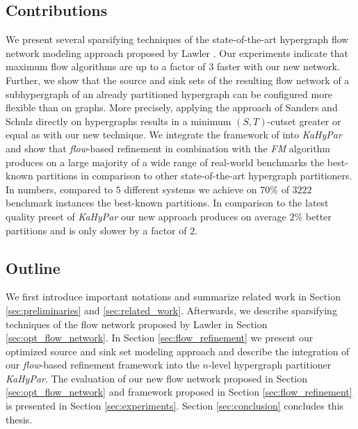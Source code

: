 \subsection{Contributions}

We present several sparsifying techniques of the state-of-the-art hypergraph flow network
modeling approach proposed by Lawler \cite{lawler1973}. Our experiments indicate that
maximum flow algorithms are up to a factor of $3$ faster with our new network. Further, 
we show that the source and sink sets of the resulting flow network of a subhypergraph 
of an already partitioned hypergraph can be configured more flexible than on graphs. More 
precisely, applying the approach of Sanders and Schulz \cite{sanders2011engineering}
directly on hypergraphs results in a minimum $(S,T)$-cutset greater or equal as with
our new technique. We integrate the framework of \cite{sanders2011engineering} into 
\emph{KaHyPar} and show that \emph{flow}-based refinement in combination with the
\emph{FM} algorithm produces on a large majority of a wide range of real-world
benchmarks the best-known partitions in comparison to other state-of-the-art hypergraph
partitioners. In numbers, compared to $5$ different systems we achieve on $70\%$ 
of $3222$ benchmark instances the best-known partitions. In comparison to the 
latest quality preset of \emph{KaHyPar} our new approach produces on average $2\%$ better 
partitions and is only slower by a factor of $2$.

\subsection{Outline}

We first introduce important notations and summarize related work in Section \ref{sec:preliminaries}
and \ref{sec:related_work}. Afterwards, we describe sparsifying techniques of the flow network
proposed by Lawler \cite{lawler1973} in Section \ref{sec:opt_flow_network}. In Section
\ref{sec:flow_refinement} we present our optimized source and sink set modeling
approach and describe the integration of our \emph{flow}-based refinement framework into
the $n$-level hypergraph partitioner \emph{KaHyPar}. The evaluation of our new flow network
proposed in Section \ref{sec:opt_flow_network} and framework proposed in Section 
\ref{sec:flow_refinement} is presented in Section \ref{sec:experiments}. 
Section \ref{sec:conclusion} concludes this thesis.